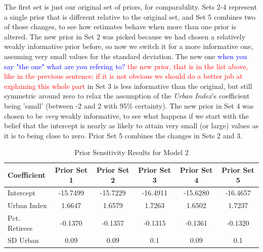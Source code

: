 \documentclass[12pt]{article}
\newcommand{\red}[1]{\textcolor{red}{#1}}
\newcommand{\blue}[1]{\textcolor{blue}{#1}}
\begin{document}
The first set is just our original set of priors, for comparability. Sets 2-4 represent a single prior that is different relative to the original set, and Set 5 combines two of those changes, to see how estimates behave when more than one prior is altered.
The new prior in Set 2 was picked because we had chosen a relatively weakly informative prior before, so now we switch it for a more informative one, assuming very small values for the standard deviation. 
The new one \blue{ when you say "the one" what are you refering to?} \red{the new prior, that is in the list above, like in the previous sentence; if it is not obvious we should do a better job at explaining this whole part} in Set 3 is less informative than the original, but still symmetric around zero to relax the assumption of the \textit{Urban Index}'s coefficient being 'small' (between -2 and 2 with 95\% certainty). 
The new prior in Set 4 was chosen to be \textit{very} weakly informative, to see what happens if we start with the belief that the intercept is nearly as likely to attain very small (or large) values as it is to being close to zero.
Prior Set 5 combines the changes in Sets 2 and 3.

\begin{table}[h]
    \centering
    \begin{tabular}{l|ccccc}
        \hline
        Coefficient    & Prior Set 1 & Prior Set 2 & Prior Set 3 & Prior Set 4 & Prior Set 5 \\
        \hline
        Intercept      & -15.7499 & -15.7229 & -16.4911 & -15.6280 & -16.4657 \\
        Urban Index    & 1.6647 & 1.6579 & 1.7263 & 1.6502 & 1.7237 \\
        Pct. Retirees  & -0.1370 & -0.1357 & -0.1315 & -0.1361 & -0.1320 \\
        SD Urban       & 0.09    & 0.09    & 0.1     & 0.09    & 0.1     \\
        \hline
    \end{tabular}
    \caption{Prior Sensitivity Results for Model 2}
    \label{tab:Prior Sensitivity Results for Model 2}
\end{table}
\end{document}
